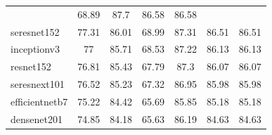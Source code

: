 \begin{table}[H]
{\begin{tabular}{lcccccc}
                                                & 68.89              & 87.7  &
            86.58                               & 86.58
            \\
            seresnet152                         & 77.31              & 86.01
                                                & 68.99              & 87.31 &
            86.51                               & 86.51
            \\
            inceptionv3                         & 77                 & 85.71
                                                & 68.53              & 87.22 &
            86.13                               & 86.13
            \\
            resnet152                           & 76.81              & 85.43
                                                & 67.79              & 87.3  &
            86.07                               & 86.07
            \\
            seresnext101                        & 76.52              & 85.23
                                                & 67.32              & 86.95 &
            85.98                               & 85.98
            \\
            efficientnetb7                      & 75.22              & 84.42
                                                & 65.69              & 85.85 &
            85.18                               & 85.18
            \\
            densenet201                         & 74.85              & 84.18
                                                & 65.63              & 86.19 &
            84.63                               & 84.63
            \\ \bottomrule
        \end{tabular}%
    }
\end{table}